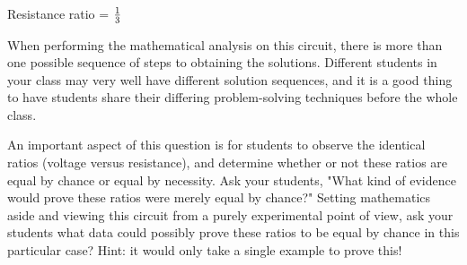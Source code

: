 \vskip 10pt

Resistance ratio = $1 \over 3$







When performing the mathematical analysis on this circuit, there is more than one possible sequence of steps to obtaining the solutions.  Different students in your class may very well have different solution sequences, and it is a good thing to have students share their differing problem-solving techniques before the whole class.

An important aspect of this question is for students to observe the identical ratios (voltage versus resistance), and determine whether or not these ratios are equal by chance or equal by necessity.  Ask your students, "What kind of evidence would prove these ratios were merely equal by chance?"  Setting mathematics aside and viewing this circuit from a purely experimental point of view, ask your students what data could possibly prove these ratios to be equal by chance in this particular case?  Hint: it would only take a single example to prove this!




